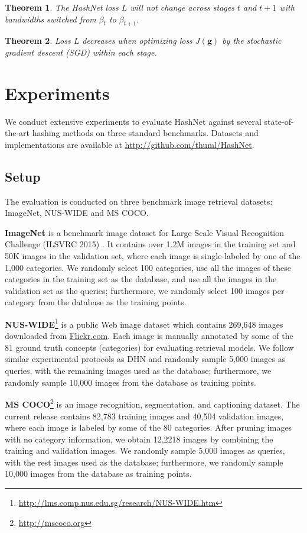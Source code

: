 \documentclass[10pt,twocolumn,letterpaper]{article}
\newtheorem{theorem}{Theorem}
\begin{document}
\begin{theorem}\label{the:stage}
The HashNet loss $L$ will not change across stages $t$ and $t+1$ with bandwidths switched from $\beta_t$ to $\beta_{t+1}$.
\end{theorem}

\begin{theorem}\label{the:converge}
Loss $L$ decreases when optimizing loss $J({\bm g})$ by the stochastic gradient descent (SGD) within each stage.
\end{theorem}

\section{Experiments}
We conduct extensive experiments to evaluate HashNet against several state-of-the-art hashing methods on three standard benchmarks. Datasets and implementations are available at \url{http://github.com/thuml/HashNet}.

\subsection{Setup}
The evaluation is conducted on three benchmark image retrieval datasets: ImageNet, NUS-WIDE and MS COCO.

\textbf{ImageNet} is a benchmark image dataset for Large Scale Visual Recognition Challenge (ILSVRC 2015) \cite{cite:ILSVRC15}. It contains over 1.2M images in the training set and 50K images in the validation set, where each image is single-labeled by one of the 1,000 categories. We randomly select 100 categories, use all the images of these categories in the training set as the database, and use all the images in the validation set as the queries; furthermore, we randomly select 100 images per category from the database as the training points.

\textbf{NUS-WIDE}\footnote{\scriptsize\url{http://lms.comp.nus.edu.sg/research/NUS-WIDE.htm}} \cite{cite:CIVR09NusWide} is a public Web image dataset which contains 269,648 images downloaded from \url{Flickr.com}. Each image is manually annotated by some of the 81 ground truth concepts (categories) for evaluating retrieval models. We follow similar experimental protocols as DHN \cite{cite:AAAI16DHN} and randomly sample 5,000 images as queries, with the remaining images used as the database; furthermore, we randomly sample 10,000 images from the database as training points.

\textbf{MS COCO}\footnote{\scriptsize\url{http://mscoco.org}} \cite{cite:MSCOCO} is an image recognition, segmentation, and captioning dataset. The current release contains 82,783 training images and 40,504 validation images, where each image is labeled by some of the 80 categories. After pruning images with no category information, we obtain 12,2218 images by combining the training and validation images. We randomly sample 5,000 images as queries, with the rest images used as the database; furthermore, we randomly sample 10,000 images from the database as training points.
\end{document}
